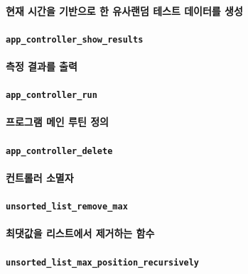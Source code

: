 \documentclass[UTF8, a4paper]{report}
\begin{document}
            \paragraph{%
                \normalfont 현재 시간을 기반으로 한 유사랜덤 테스트 데이터를 생성
            }
            
            \paragraph{\texttt{app\_controller\_show\_results}}
            \paragraph{%
                \normalfont 측정 결과를 출력
            }
            
            \paragraph{\texttt{app\_controller\_run}}
            \paragraph{%
                \normalfont 프로그램 메인 루틴 정의
            }
            
            \paragraph{\texttt{app\_controller\_delete}}
            \paragraph{%
                \normalfont 컨트롤러 소멸자
            }
            
            \paragraph{\texttt{unsorted\_list\_remove\_max}}
            \paragraph{%
                \normalfont 최댓값을 리스트에서 제거하는 함수 
            }

            \paragraph{\texttt{unsorted\_list\_max\_position\_recursively}}
\end{document}
